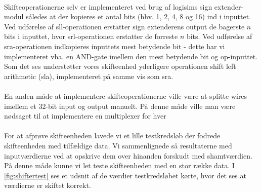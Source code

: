 \documentclass[10pt,a4paper,danish]{article}
\begin{document}
\paragraph{}
Skifteoperationerne selv er implementeret ved brug af logisims sign extender-modul således at 
der kopieres et antal bits (hhv. 1, 2, 4, 8 og 16) ind i inputtet. Ved udførelse
af sll-operationen erstatter sign extenderens output de bagerste $n$ bits i inputtet, hvor 
srl-operationen erstatter de forreste $n$ bits. Ved udførelse af sra-operationen indkopieres
inputtets mest betydende bit - dette har vi implementeret vha. en AND-gate imellem den mest
betydende bit og op-inputtet. Som det ses understøtter vores skifteenhed yderligere 
operationen shift left arithmetic (sla), implementeret på samme vis som sra.

\paragraph{}
En anden måde at implementere skifteoperationerne ville være at splitte wires imellem
et 32-bit input og output manuelt. På denne måde ville man være nødsaget til at implementere
en multiplexer for hver 

\paragraph{}
For at afprøve skifteenheden lavede vi et lille testkredsløb der fodrede skifteenheden med tilfældige data.
Vi sammenlignede så resultaterne med inputværdierne ved at opskrive dem over hinanden forskudt med shamtværdien.
På denne måde kunne vi let teste skifteenheden med en stor række data.
I \ref{fig:shiftertest} ses et udsnit af de værdier testkredsløbet kørte, hvor det ses at værdierne er skiftet korrekt.
\end{document}
